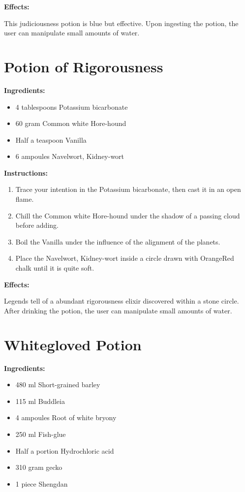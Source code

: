 \documentclass{article}
\begin{document}
\textbf{Effects:}

This judiciousness potion is blue but effective. Upon ingesting the potion, the user can manipulate small amounts of water.

\newpage
\section*{Potion of Rigorousness}

\textbf{Ingredients:}

\begin{itemize}
  \item 4 tablespoons Potassium bicarbonate
  \item 60 gram Common white Hore-hound
  \item Half a teaspoon Vanilla
  \item 6 ampoules Navelwort, Kidney-wort
\end{itemize}

\textbf{Instructions:}

\begin{enumerate}
  \item Trace your intention in the Potassium bicarbonate, then cast it in an open flame.
  \item Chill the Common white Hore-hound under the shadow of a passing cloud before adding.
  \item Boil the Vanilla under the influence of the alignment of the planets.
  \item Place the Navelwort, Kidney-wort inside a circle drawn with OrangeRed chalk until it is quite soft.
\end{enumerate}

\textbf{Effects:}

Legends tell of a abundant rigorousness elixir discovered within a stone circle. After drinking the potion, the user can manipulate small amounts of water.

\newpage
\section*{Whitegloved Potion}

\textbf{Ingredients:}

\begin{itemize}
  \item 480 ml Short-grained barley
  \item 115 ml Buddleia
  \item 4 ampoules Root of white bryony
  \item 250 ml Fish-glue
  \item Half a portion Hydrochloric acid
  \item 310 gram gecko
  \item 1 piece Shengdan
\end{itemize}
\end{document}
